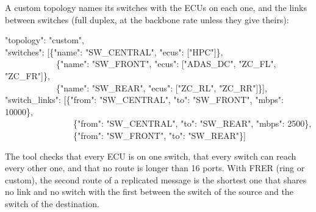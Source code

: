 A custom topology names its switches with the ECUs on each one, and the
links between switches (full duplex, at the backbone rate unless they
give theirs):
\begin{shell}
"topology": "custom",\\
"switches": [\{"name": "SW\_CENTRAL", "ecus": ["HPC"]\},\\
\ \ \ \ \ \ \ \ \ \ \ \ \{"name": "SW\_FRONT", "ecus": ["ADAS\_DC", "ZC\_FL", "ZC\_FR"]\},\\
\ \ \ \ \ \ \ \ \ \ \ \ \{"name": "SW\_REAR", "ecus": ["ZC\_RL", "ZC\_RR"]\}],\\
"switch\_links": [\{"from": "SW\_CENTRAL", "to": "SW\_FRONT", "mbps": 10000\},\\
\ \ \ \ \ \ \ \ \ \ \ \ \ \ \ \ \{"from": "SW\_CENTRAL", "to": "SW\_REAR", "mbps": 2500\},\\
\ \ \ \ \ \ \ \ \ \ \ \ \ \ \ \ \{"from": "SW\_FRONT", "to": "SW\_REAR"\}]
\end{shell}
The tool checks that every ECU is on one switch, that every switch can
reach every other one, and that no route is longer than 16 ports. With
FRER (ring or custom), the second route of a replicated message is the
shortest one that shares no link and no switch with the first between the
switch of the source and the switch of the destination.

